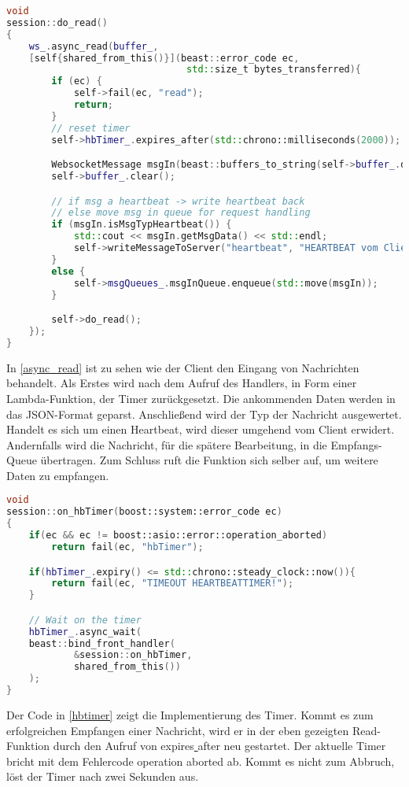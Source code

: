 \documentclass[thesis.tex]{subfiles}
\begin{document}
\begin{lstlisting}[caption={Asynchrone Read-Funktion},captionpos=b,language=C++,label=async_read]
void
session::do_read()
{
    ws_.async_read(buffer_,
    [self{shared_from_this()}](beast::error_code ec,
                                std::size_t bytes_transferred){
        if (ec) {
            self->fail(ec, "read");
            return;
        }
        // reset timer
        self->hbTimer_.expires_after(std::chrono::milliseconds(2000));

        WebsocketMessage msgIn(beast::buffers_to_string(self->buffer_.data()));
        self->buffer_.clear();

        // if msg a heartbeat -> write heartbeat back
        // else move msg in queue for request handling
        if (msgIn.isMsgTypHeartbeat()) {
            std::cout << msgIn.getMsgData() << std::endl;
            self->writeMessageToServer("heartbeat", "HEARTBEAT vom Client");
        }
        else {
            self->msgQueues_.msgInQueue.enqueue(std::move(msgIn));
        }

        self->do_read();
    });
}
\end{lstlisting}

In \autoref{async_read} ist zu sehen wie der Client den Eingang von Nachrichten behandelt.
Als Erstes wird nach dem Aufruf des Handlers, in Form einer Lambda-Funktion, der Timer zurückgesetzt.
Die ankommenden Daten werden in das JSON-Format geparst.
Anschließend wird der Typ der Nachricht ausgewertet.
Handelt es sich um einen Heartbeat, wird dieser umgehend vom Client erwidert.
Andernfalls wird die Nachricht, für die spätere Bearbeitung, in die Empfangs-Queue übertragen.
Zum Schluss ruft die Funktion sich selber auf, um weitere Daten zu empfangen.

\begin{lstlisting}[caption={Heartbeat Timer},captionpos=b,language=C++,label=hbtimer]
void
session::on_hbTimer(boost::system::error_code ec)
{
    if(ec && ec != boost::asio::error::operation_aborted)
        return fail(ec, "hbTimer");

    if(hbTimer_.expiry() <= std::chrono::steady_clock::now()){
        return fail(ec, "TIMEOUT HEARTBEATTIMER!");
    }

    // Wait on the timer
    hbTimer_.async_wait(
    beast::bind_front_handler(
            &session::on_hbTimer,
            shared_from_this())
    );
}
\end{lstlisting}

Der Code in \autoref{hbtimer} zeigt die Implementierung des Timer.
Kommt es zum erfolgreichen Empfangen einer Nachricht, wird er in der eben gezeigten Read-Funktion durch den Aufruf von \glqq expires\underline{ }after\grqq{} neu gestartet.
Der aktuelle Timer bricht mit dem Fehlercode \glqq operation aborted\grqq{} ab.
Kommt es nicht zum Abbruch, löst der Timer nach zwei Sekunden aus.
\end{document}
